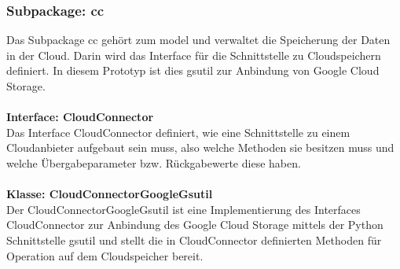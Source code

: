 \documentclass[13pt,a4paper,bibliography=totocnumbered,listof=totocnumbered]{scrartcl}
\begin{document}
\subsubsection{Subpackage: cc}
Das Subpackage cc gehört zum model und verwaltet die Speicherung der Daten in der Cloud. Darin wird das Interface für die Schnittstelle zu Cloudspeichern definiert. In diesem Prototyp ist dies gsutil zur Anbindung von Google Cloud Storage.\\\\
\textbf{Interface: CloudConnector}\\
Das Interface CloudConnector definiert, wie eine Schnittstelle zu einem Cloudanbieter aufgebaut sein muss, also welche Methoden sie besitzen muss und welche Übergabeparameter bzw. Rückgabewerte diese haben.\\\\
\textbf{Klasse: CloudConnectorGoogleGsutil}\\
Der CloudConnectorGoogleGsutil ist eine Implementierung des Interfaces CloudConnector zur Anbindung des Google Cloud Storage mittels der Python Schnittstelle gsutil und stellt die in CloudConnector definierten Methoden für Operation auf dem Cloudspeicher bereit.
\end{document}
